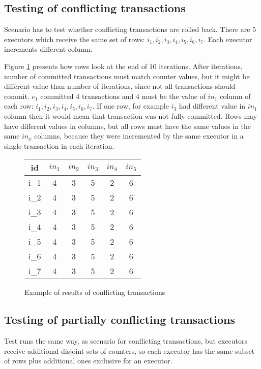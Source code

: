\subsection{Testing of conflicting transactions}
Scenario has to test whether conflicting transactions are rolled back. 
There are $5$ executors which receive the same set of rows: $i_1, i_2, i_3, i_4, i_5, i_6, i_7$. Each executor
increments different column.

Figure \ref{fig:exampleConflictingTransactions} presents how rows look at the end of $10$ iterations.
After iterations, number of committed transactions must match counter values, but it might be different value than number of iterations, since not all transactions should commit. $e_1$ committed $4$ transactions and $4$ must be the value of $in_1$ column of each row: $i_1, i_2, i_3, i_4, i_5, i_6, i_7$. If one row, for example $i_3$ had different value in $in_1$ column then it would mean that transaction was not fully committed.
Rows may have different values in columns, but all rows must have the same values in the same $in_{x}$ columns, because they were incremented by the same executor in a single transaction in each iteration.


\begin{figure}[h]
\centering
\begin{tabular}{c||c|c|c|c|c}
        \toprule
        id & $in_{1}$ & $in_{2}$ & $in_{3}$ & $in_{4}$ & $in_{5}$ \\ \midrule
        i_1 &   4        & 3        & 5        &  2       & 6        \\
        i_2 &   4        & 3        & 5        &  2       & 6         \\ 
        i_3 &   4        & 3        & 5        &  2       & 6         \\ 
        i_4 &   4        & 3        & 5        &  2       & 6         \\ 
        i_5 &   4        & 3        & 5        &  2       & 6         \\ 
        i_6 &   4        & 3        & 5        &  2       & 6         \\ 
        i_7 &   4        & 3        & 5        &  2       & 6         \\  \bottomrule
      \end{tabular}
      \caption{Example of results of conflicting transactions}
  \label{fig:exampleConflictingTransactions}
\end{figure}

\subsection{Testing of partially conflicting transactions}
Test runs the same way, as scenario for conflicting transactions, but executors receive additional disjoint sets of counters, so each executor has the same subset of rows plus additional ones exclusive for an executor. 

